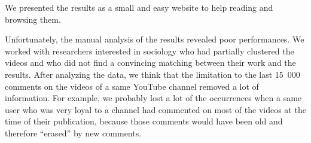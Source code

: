 We presented the results as a small and easy website to help reading and browsing them.

Unfortunately, the manual analysis of the results revealed poor performances. We worked with researchers interested in sociology who had partially clustered the videos and who did not find a convincing matching between their work and the results. After analyzing the data, we think that the limitation to the last 15~000 comments on the videos of a same YouTube channel removed a lot of information. For example, we probably lost a lot of the occurrences when a same user who was very loyal to a channel had commented on most of the videos at the time of their publication, because those comments would have been old and therefore “erased” by new comments.
